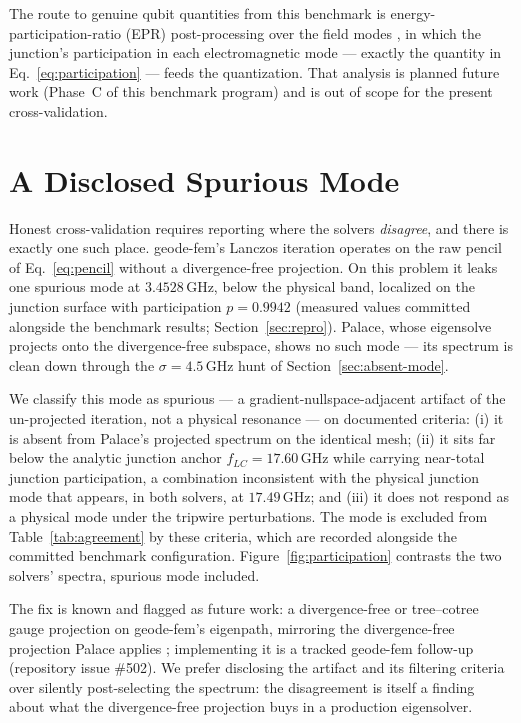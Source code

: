 \documentclass{anvil-paper}
\begin{document}
The route to genuine qubit quantities from this benchmark is
energy-participation-ratio (EPR) post-processing over the field modes
\citep{minev2021,nigg2012}, in which the junction's participation in each
electromagnetic mode --- exactly the quantity in
Eq.~\ref{eq:participation} --- feeds the quantization. That analysis is
planned future work (Phase~C of this benchmark program) and is out of scope
for the present cross-validation.

\section{A Disclosed Spurious Mode}
\label{sec:spurious-mode}

Honest cross-validation requires reporting where the solvers
\emph{disagree}, and there is exactly one such place. geode-fem's Lanczos
iteration operates on the raw pencil of Eq.~\ref{eq:pencil} without a
divergence-free projection. On this problem it leaks one spurious mode at
$3.4528$\,GHz, below the physical band, localized on the junction surface
with participation $p = 0.9942$ (measured values committed alongside the
benchmark results; Section~\ref{sec:repro}). Palace, whose eigensolve
projects onto the divergence-free subspace, shows no such mode --- its
spectrum is clean down through the $\sigma = 4.5$\,GHz hunt of
Section~\ref{sec:absent-mode}.

We classify this mode as spurious --- a gradient-nullspace-adjacent
artifact of the un-projected iteration, not a physical resonance --- on
documented criteria: (i) it is absent from Palace's projected spectrum on
the identical mesh; (ii) it sits far below the analytic junction anchor
$f_{LC} = 17.60$\,GHz while carrying near-total junction participation,
a combination inconsistent with the physical junction mode that appears,
in both solvers, at $17.49$\,GHz; and (iii) it does not respond as a
physical mode under the tripwire perturbations. The mode is excluded from
Table~\ref{tab:agreement} by these criteria, which are recorded alongside
the committed benchmark configuration. Figure~\ref{fig:participation}
contrasts the two solvers' spectra, spurious mode included.

The fix is known and flagged as future work: a divergence-free or
tree--cotree gauge projection on geode-fem's eigenpath, mirroring the
divergence-free projection Palace applies \citep{palace}; implementing it
is a tracked geode-fem follow-up (repository issue \#502). We prefer
disclosing the artifact and its filtering criteria over silently
post-selecting the spectrum: the disagreement is itself a finding about
what the divergence-free projection buys in a production eigensolver.
\end{document}
